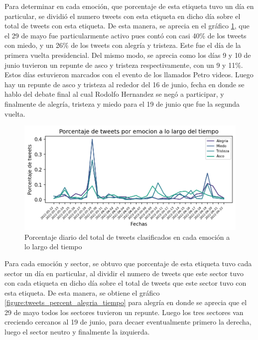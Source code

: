 Para determinar en cada emoción, que porcentaje de esta etiqueta tuvo un día en particular, se  dividió el numero tweets con esta etiqueta en dicho día sobre el total de tweets con esta etiqueta. De esta manera, se aprecia en el gráfico  \ref{figure:tweets_percent_tiempo}, que el 29 de mayo fue particularmente activo pues contó con casi 40\% de los tweets con miedo, y un 26\% de los tweets con alegría y tristeza. Este fue el día de la primera vuelta presidencial. Del mismo modo, se aprecia como los días 9 y 10 de junio tuvieron un repunte de asco y tristeza respectivamente, con un 9 y 11\%. Estos días estuvieron marcados con el evento de los llamados Petro videos. Luego hay un repunte de asco y tristeza al rededor del 16 de junio, fecha en donde se hablo del debate final al cual Rodolfo Hernandez se negó a participar, y finalmente de alegría, tristeza y miedo para el 19 de junio que fue la segunda vuelta.

\begin{figure}[t]
	\centering
	\includegraphics{Images & Logos/Results/Porcentaje de tweets por emocion a lo largo del tiempo.png} 
	\caption{Porcentaje diario del total de tweets clasificados en cada emoción a lo largo del tiempo}
	\label{figure:tweets_percent_tiempo}
\end{figure}



Para cada emoción y sector, se obtuvo que porcentaje de esta etiqueta tuvo cada sector un día en particular, al dividir el numero de tweets que este sector tuvo con cada etiqueta en dicho día sobre el total de tweets que este sector tuvo con esta etiqueta. De esta manera, se obtiene el gráfico \ref{figure:tweets_percent_alegria_tiempo} para alegría en donde se aprecia que el 29 de mayo todos los sectores tuvieron un repunte. Luego los tres sectores van creciendo cercanos al 19 de junio, para decaer eventualmente primero la derecha, luego el sector neutro y finalmente la izquierda.




